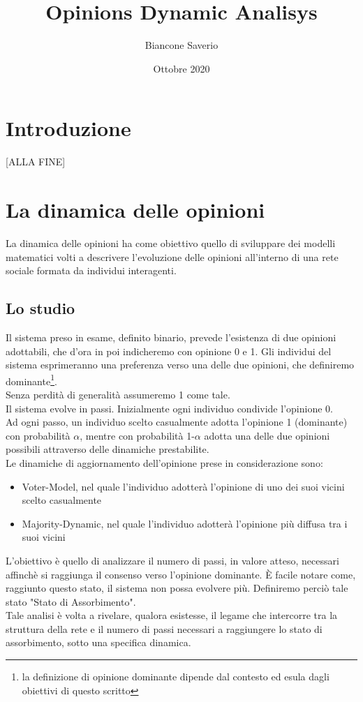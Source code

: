 \documentclass{article}
\title{Opinions Dynamic Analisys}
\author{Biancone Saverio}
\date{Ottobre 2020}
\begin{document}
\maketitle

\section{Introduzione}
[ALLA FINE]
\section{La dinamica delle opinioni}
La dinamica delle opinioni ha come obiettivo quello di sviluppare dei modelli matematici volti a descrivere l'evoluzione delle opinioni all'interno di una rete sociale formata da individui interagenti.\\
\subsection{Lo studio}
Il sistema preso in esame, definito binario, prevede l'esistenza di due opinioni adottabili, che d'ora in poi indicheremo con opinione 0 e 1. Gli individui del sistema esprimeranno una preferenza verso una delle due opinioni, che definiremo  dominante\footnote{la definizione di opinione dominante dipende dal contesto ed esula dagli obiettivi di questo scritto}.\\
Senza perdità di generalità assumeremo 1 come tale.\\
Il sistema evolve in passi. Inizialmente ogni individuo condivide l'opinione 0.\\
Ad ogni passo, un individuo scelto casualmente adotta l'opinione 1 (dominante) con probabilità $\alpha$, mentre con probabilità 1-$\alpha$ adotta una delle due opinioni possibili attraverso delle dinamiche prestabilite.\\
Le dinamiche di aggiornamento dell'opinione prese in considerazione sono:
\begin{itemize}
\item Voter-Model, nel quale l'individuo adotterà l'opinione di uno dei suoi vicini scelto casualmente
\item Majority-Dynamic, nel quale l'individuo adotterà l'opinione più diffusa tra i suoi vicini
\end{itemize}
L'obiettivo è quello di analizzare il numero di passi, in valore atteso, necessari affinchè si raggiunga il consenso verso l'opinione dominante. È facile notare come, raggiunto questo stato, il sistema non possa evolvere più. Definiremo perciò tale stato "Stato di Assorbimento". \\
Tale analisi è volta a rivelare, qualora esistesse, il legame che intercorre tra la struttura della rete e il numero di passi necessari a raggiungere lo stato di assorbimento, sotto una specifica dinamica.
\end{document}
